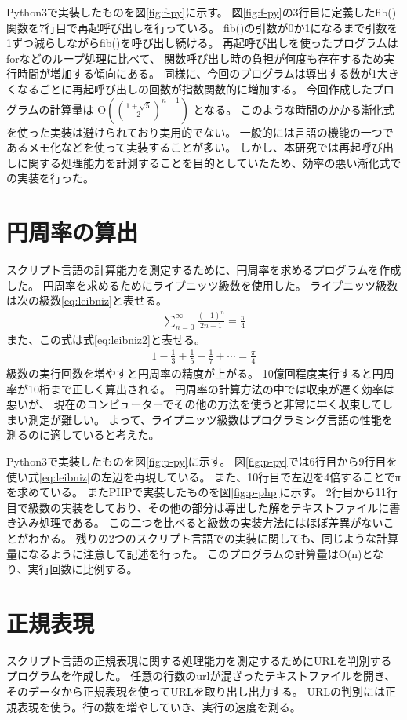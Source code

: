 Python3で実装したものを図\ref{fig:f-py}に示す。
図\ref{fig:f-py}の3行目に定義したfib()関数を7行目で再起呼び出しを行っている。
fib()の引数が0か1になるまで引数を1ずつ減らしながらfib()を呼び出し続ける。
再起呼び出しを使ったプログラムはforなどのループ処理に比べて、
関数呼び出し時の負担が何度も存在するため実行時間が増加する傾向にある。
同様に、今回のプログラムは導出する数が1大きくなるごとに再起呼び出しの回数が指数関数的に増加する。
今回作成したプログラムの計算量は O$((\frac{1 +\sqrt{5}}{2})^{n-1})$ となる。
このような時間のかかる漸化式を使った実装は避けられており実用的でない。
一般的には言語の機能の一つであるメモ化などを使って実装することが多い。
しかし、本研究では再起呼び出しに関する処理能力を計測することを目的としていたため、効率の悪い漸化式での実装を行った。

\section{円周率の算出}
スクリプト言語の計算能力を測定するために、円周率を求めるプログラムを作成した。
円周率を求めるためにライプニッツ級数を使用した。
ライプニッツ級数は次の級数\ref{eq:leibniz}と表せる。
\begin{eqnarray} \label{eq:leibniz}
\sum_{n=0}^{\infty}\frac{(-1)^n}{2n+1}=\frac{\pi}{4}
\end{eqnarray}
また、この式は式\ref{eq:leibniz2}と表せる。
\begin{eqnarray} \label{eq:leibniz2}
1-\frac{1}{3}+\frac{1}{5}-\frac{1}{7}+\cdots=\frac{\pi}{4}
\end{eqnarray}
級数の実行回数を増やすと円周率の精度が上がる。
10億回程度実行すると円周率が10桁まで正しく算出される。
円周率の計算方法の中では収束が遅く効率は悪いが、
現在のコンピューターでその他の方法を使うと非常に早く収束してしまい測定が難しい。
よって、ライプニッツ級数はプログラミング言語の性能を測るのに適していると考えた。

Python3で実装したものを図\ref{fig:p-py}に示す。
図\ref{fig:p-py}では6行目から9行目を使い式\ref{eq:leibniz}の左辺を再現している。
また、10行目で左辺を4倍することでπを求めている。
またPHPで実装したものを図\ref{fig:p-php}に示す。
2行目から11行目で級数の実装をしており、その他の部分は導出した解をテキストファイルに書き込み処理である。
この二つを比べると級数の実装方法にはほぼ差異がないことがわかる。
残りの2つのスクリプト言語での実装に関しても、同じような計算量になるように注意して記述を行った。
このプログラムの計算量はO(n)となり、実行回数に比例する。

\section{正規表現}
スクリプト言語の正規表現に関する処理能力を測定するためにURLを判別するプログラムを作成した。
任意の行数のurlが混ざったテキストファイルを開き、そのデータから正規表現を使ってURLを取り出し出力する。
URLの判別には正規表現を使う。行の数を増やしていき、実行の速度を測る。

